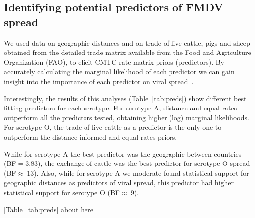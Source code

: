 \documentclass[10pt]{article}
\begin{document}
\subsection*{Identifying potential predictors of FMDV spread}

We used data on geographic distances and on trade of live cattle, pigs and sheep obtained from the detailed trade matrix available from the Food and Agriculture Organization (FAO), to elicit CMTC rate matrix priors (predictors).
By accurately calculating the marginal likelihood of each predictor we can gain insight into the importance of each predictor on viral spread~\cite{Carvalho2013,Nelson2011}.

Interestingly, the results of this analyses (Table~\ref{tab:preds}) show different best fitting predictors for each serotype.
For serotype A, distance and equal-rates outperform all the predictors tested, obtaining higher (log) marginal likelihoods.
For serotype O, the trade of live cattle as a predictor is the only one to outperform the distance-informed and equal-rates  priors.

While for serotype A the best predictor was the geographic between countries (BF$=3.83$), the exchange of cattle was the best predictor for serotype O spread (BF$\approx~13$).
Also, while for serotype A we moderate found statistical support for geographic distances as predictors of viral spread, this predictor had higher statistical support for serotype O (BF$\approx~9$).

\begin{center}
 [Table~\ref{tab:preds} about here]
\end{center}
\end{document}

